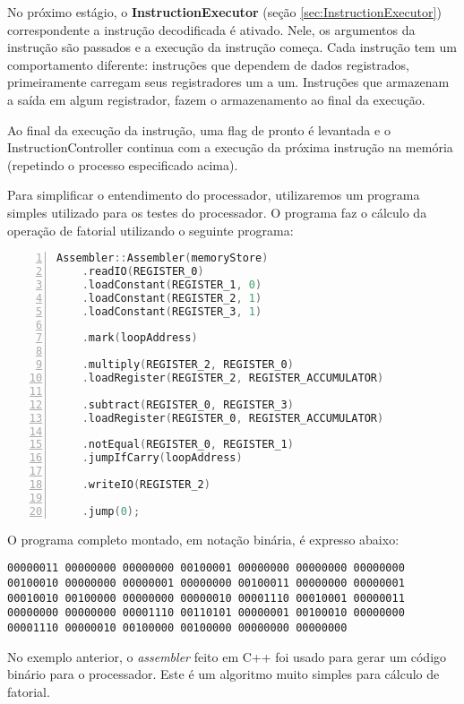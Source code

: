 \documentclass[11pt]{report}
\begin{document}
No próximo estágio, o \textbf{InstructionExecutor} (seção \ref{sec:InstructionExecutor}) correspondente a instrução decodificada é ativado. Nele, os argumentos da instrução são passados e a execução da instrução começa. Cada instrução tem um comportamento diferente: instruções que dependem de dados registrados, primeiramente carregam seus registradores um a um. Instruções que armazenam a saída em algum registrador, fazem o armazenamento ao final da execução.

Ao final da execução da instrução, uma flag de pronto é levantada e o InstructionController continua com a execução da próxima instrução na memória (repetindo o processo especificado acima).

Para simplificar o entendimento do processador, utilizaremos um programa simples utilizado para os testes do processador. O programa faz o cálculo da operação de fatorial utilizando o seguinte programa:

\begin{lstlisting}[language=C++,caption={Exemplo de código utilizado pelo Assembler},stepnumber=1,numbers=left,showlines=true]
Assembler::Assembler(memoryStore)
	.readIO(REGISTER_0)
	.loadConstant(REGISTER_1, 0)
	.loadConstant(REGISTER_2, 1)
	.loadConstant(REGISTER_3, 1)

	.mark(loopAddress)

	.multiply(REGISTER_2, REGISTER_0)
	.loadRegister(REGISTER_2, REGISTER_ACCUMULATOR)

	.subtract(REGISTER_0, REGISTER_3)
	.loadRegister(REGISTER_0, REGISTER_ACCUMULATOR)

	.notEqual(REGISTER_0, REGISTER_1)
	.jumpIfCarry(loopAddress)

	.writeIO(REGISTER_2)

	.jump(0);
\end{lstlisting}

O programa completo montado, em notação binária, é expresso abaixo:

\begin{lstlisting}[breakatwhitespace=true,breakindent=0em,breaklines=true]
00000011 00000000 00000000 00100001 00000000 00000000 00000000 00100010 00000000 00000001 00000000 00100011 00000000 00000001 00010010 00100000 00000000 00000010 00001110 00010001 00000011 00000000 00000000 00001110 00110101 00000001 00100010 00000000 00001110 00000010 00100000 00100000 00000000 00000000 
\end{lstlisting}

No exemplo anterior, o \emph{assembler} feito em C++ foi usado para gerar um código binário para o processador. Este é um algoritmo muito simples para cálculo de fatorial.
\end{document}
